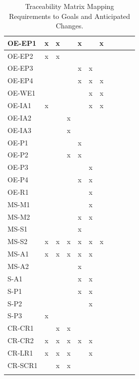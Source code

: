 \documentclass[12pt]{article}
\begin{document}
\begin{longtable}{|l|*{5}{c|}*{5}{c|}}
  OE-EP1  & x & x &  & x &  & x &  &  &  &  \\ \hline
  OE-EP2  & x & x &  &  &  &  &  &  &  &  \\ \hline
  OE-EP3  &  &  &  & x & x &  &  &  &  &  \\ \hline
  OE-EP4  &  &  &  & x & x & x &  &  &  &  \\ \hline
  OE-WE1  &  &  &  &  & x & x &  &  &  &  \\ \hline
  OE-IA1  & x &  &  &  & x & x &  &  &  &  \\ \hline
  OE-IA2  &  &  & x &  &  &  &  &  &  &  \\ \hline
  OE-IA3  &  &  & x &  &  &  &  &  &  &  \\ \hline
  OE-P1   &  &  &  & x &  &  &  &  &  &  \\ \hline
  OE-P2   &  &  & x & x &  &  &  &  &  &  \\ \hline
  OE-P3   &  &  &  &  & x &  &  &  &  &  \\ \hline
  OE-P4   &  &  &  & x & x &  &  &  &  &  \\ \hline
  OE-R1   &  &  &  &  & x &  &  &  &  &  \\ \hline
  
  MS-M1   &  &  &  &  & x &  &  &  &  &  \\ \hline
  MS-M2   &  &  &  & x & x &  &  &  &  &  \\ \hline
  MS-S1   &  &  &  & x &  &  &  &  &  &  \\ \hline
  MS-S2   & x & x & x & x & x & x &  &  &  &  \\ \hline
  MS-A1   & x & x & x & x & x &  &  &  &  &  \\ \hline
  MS-A2   &  &  &  & x &  &  &  &  &  &  \\ \hline
  
  S-A1    &  &  &  & x & x &  &  &  &  &  \\ \hline
  S-P1    &  &  &  & x & x &  &  &  &  &  \\ \hline
  S-P2    &  &  &  &  & x &  &  &  &  &  \\ \hline
  S-P3    & x &  &  &  &  &  &  &  &  &  \\ \hline
  
  CR-CR1  &  & x & x &  &  &  &  &  &  &  \\ \hline
  CR-CR2  & x & x & x & x & x &  &  &  &  &  \\ \hline
  
  CR-LR1  & x & x & x &  & x &  &  &  &  &  \\ \hline
  CR-SCR1 &  & x & x &  &  &  &  &  &  &  \\ \hline
  
  \caption{Traceability Matrix Mapping Requirements to Goals and Anticipated Changes.}
  \label{Table:map_reqs}
\end{longtable}
\end{document}

